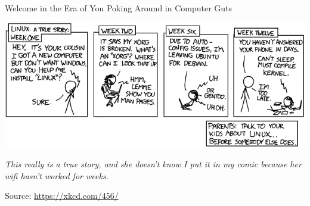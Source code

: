 
\begin{frame}{Welcome in the Era of You Poking Around in Computer Guts}
%
\begin{center}
	\includegraphics[width=.8\linewidth]{./gfx/11-xkcd-linux}

	\emph{This really is a true story, and she doesn't know I put it in my comic because her wifi hasn't worked for weeks.}

	Source: \url{https://xkcd.com/456/}
\end{center}
%
\end{frame}
